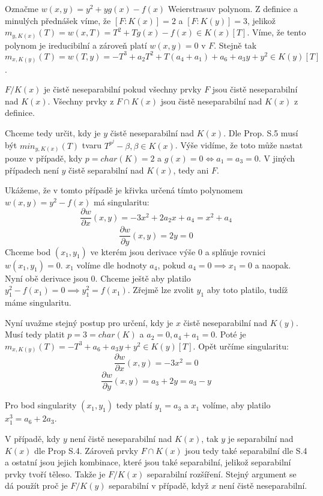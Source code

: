 \documentclass[12pt, a4paper]{article}
\begin{document}
\section{}
Označme $w(x,y) = y^2 + yg(x) - f(x)$ Weierstrasuv polynom. Z definice a minulých přednášek víme, že $[F:K(x)]=2$ a $[F:K(y)] = 3$, jelikož $m_{y,K(x)}(T) = w(x,T) = T^2 + Tg(x) - f(x) \in K(x)[T]$. Víme, že tento polynom je ireducibilní a zároveň platí $w(x,y) = 0$ v $F$. Stejně tak $m_{x,K(y)}(T) = w(T,y) = -T^3 + a_2T^2 + T(a_4+a_1) + a_6 + a_3y + y^2 \in K(y)[T]$. 

$F/K(x)$ je čistě neseparabilní pokud všechny prvky $F$ jsou čistě neseparabilní nad $K(x)$. Všechny prvky  z $F \cap K(x)$ jsou čistě neseparabilní nad $K(x)$ z definice. 

Chceme tedy určit, kdy je $y$ čistě neseparabilní nad $K(x)$. Dle Prop. S.5 musí být $min_{y,K(x)}(T)$ tvaru $T^{p^j}-\beta, \beta \in K(x)$. Výše vidíme, že toto může nastat pouze v případě, kdy $p = char(K) = 2$ a $g(x)=0 \iff a_1=a_3=0$. V jiných případech není $y$ čistě separabilní nad $K(x)$, tedy ani $F$.

Ukážeme, že v tomto případě je křivka určená tímto polynomem $w(x,y)= y^2 - f(x)$ má singularitu:
\[ 
\frac{\partial w}{\partial x}(x,y) = -3x^2+2a_2x+a_4 = x^2+a_4
\]
\[
\frac{\partial w}{\partial y}(x,y) = 2y = 0
\]
Chceme bod $(x_1,y_1)$ ve kterém jsou derivace výše $0$ a splňuje rovnici $w(x_1,y_1)=0$. $x_1$ volíme dle hodnoty $a_4$, pokud $a_4 = 0 \implies x_1 = 0$ a naopak. Nyní obě derivace jsou 0. Chceme ještě aby platilo $y_1^2-f(x_1) = 0 \implies y_1^2 = f(x_1)$. Zřejmě lze zvolit $y_1$ aby toto platilo, tudíž máme singularitu.

Nyní uvažme stejný postup pro určení, kdy je $x$ čistě neseparabilní nad $K(y)$. Musí tedy platit $p=3=char(K)$ a $a_2=0, a_4+a_1 = 0$. Poté je $m_{x,K(y)}(T)=-T^3+a_6 + a_3y + y^2 \in K(y)[T]$.
Opět určíme singularitu:
\[ 
\frac{\partial w}{\partial x}(x,y) = -3x^2 = 0
\]
\[
\frac{\partial w}{\partial y}(x,y) = a_3+2y = a_3 - y
\]

Pro bod singularity $(x_1,y_1)$ tedy platí $y_1 = a_3$ a $x_1$ volíme, aby platilo $x_1^3=a_6+2a_3$.

V případě, kdy $y$ není čistě neseparabilní nad $K(x)$, tak $y$ je separabilní nad $K(x)$ dle Prop S.4. Zároveň prvky $F \cap K(x)$ jsou tedy také separabilní dle S.4 a ostatní jsou jejich kombinace, které jsou také separabilní, jelikož separabilní prvky tvoří těleso. Takže je $F/K(x)$ separabilní rozšíření. Stejný argument se dá použít proč je $F/K(y)$ separabilní v případě, když $x$ není čistě neseparabilní.
\end{document}
